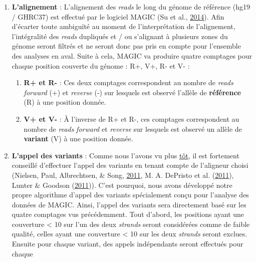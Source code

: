 \documentclass[12pt,twoside]{reedthesis}
\providecommand{\tightlist}{%
  \setlength{\itemsep}{0pt}\setlength{\parskip}{0pt}}
\theoremstyle{definition}
\theoremstyle{definition}
\theoremstyle{remark}
\begin{document}
  \begin{enumerate}
  \def\labelenumi{\arabic{enumi}.}
  \tightlist
  \item
    \textbf{L'alignement} : L'alignement des \emph{reads} le long du
    génome de référence (hg19 / GHRC37) est effectué par le logiciel MAGIC
    (Su et al., \protect\hyperlink{ref-Su2014}{2014}). Afin d'écarter
    toute ambiguïté au moment de l'interprétation de l'alignement,
    l'intégralité des \emph{reads} dupliqués et / ou s'alignant à
    plusieurs zones du génome seront filtrés et ne seront donc pas pris en
    compte pour l'ensemble des analyses en aval. Suite à cela, MAGIC va
    produire quatre comptages pour chaque position couverte du génome :
    R+, V+, R- et V- :
  
    \begin{enumerate}
    \def\labelenumii{\alph{enumii}.}
    \tightlist
    \item
      \textbf{R+ et R-} : Ces deux comptages correspondent au nombre de
      \emph{reads} \emph{forward} (+) et \emph{reverse} (-) sur lesquels
      est observé l'allèle de \textbf{référence} (R) à une position
      donnée.\\
    \item
      \textbf{V+ et V-} : À l'inverse de R+ et R-, ces comptages
      correspondent au nombre de \emph{reads} \emph{forward} et
      \emph{reverse} sur lesquels est observé un allèle de
      \textbf{variant} (V) à une position donnée.\\
    \end{enumerate}
  \item
    \textbf{L'appel des variants} : Comme nous l'avons vu plus
    \protect\hyperlink{varcall}{tôt}, il est fortement conseillé
    d'effectuer l'appel des variants en tenant compte de l'aligneur choisi
    (Nielsen, Paul, Albrechtsen, \& Song,
    \protect\hyperlink{ref-Nielsen2011}{2011}, M. A. DePristo et al.
    (\protect\hyperlink{ref-DePristo2011}{2011}), Lunter \& Goodson
    (\protect\hyperlink{ref-Lunter2011}{2011})). C'est pourquoi, nous
    avons développé notre propre algorithme d'appel des variants
    spécialement conçu pour l'analyse des données de MAGIC. Ainsi, l'appel
    des variants sera directement basé sur les quatre comptages vus
    précédemment. Tout d'abord, les positions ayant une couverture
    \textless{} 10 sur l'un des deux \emph{strands} seront considérées
    comme de faible qualité, celles ayant une couverture \textless{} 10
    sur les deux \emph{strands} seront exclues. Ensuite pour chaque
    variant, des appels indépendants seront effectués pour chaque

\end{enumerate}
\end{document}
